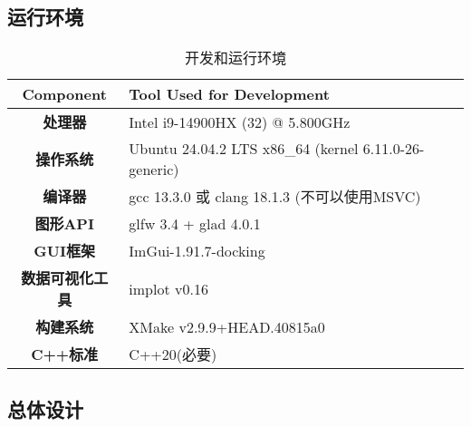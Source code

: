 \documentclass{article}
\begin{document}
\subsection{运行环境}
\begin{table}[H]
    \centering
    \caption{开发和运行环境}
    \begin{tabular}{@{}>{\bfseries}c>{\raggedright\arraybackslash}p{10cm}@{}} %
        \toprule
        \textbf{Component} & \textbf{Tool Used for Development}                    \\
        \midrule
        处理器                & Intel i9-14900HX (32) @ 5.800GHz                      \\
        操作系统               & Ubuntu 24.04.2 LTS x86\_64 (kernel 6.11.0-26-generic) \\
        编译器                & gcc 13.3.0 或 clang 18.1.3 (不可以使用MSVC)                 \\
        图形API              & glfw 3.4 + glad 4.0.1                                 \\
        GUI框架              & ImGui-1.91.7-docking                                  \\
        数据可视化工具            & implot v0.16                                          \\
        构建系统               & XMake v2.9.9+HEAD.40815a0                             \\
        C++标准              & C++20(必要)                                             \\
        \bottomrule
    \end{tabular}
\end{table}
\subsection{总体设计}
\end{document}
